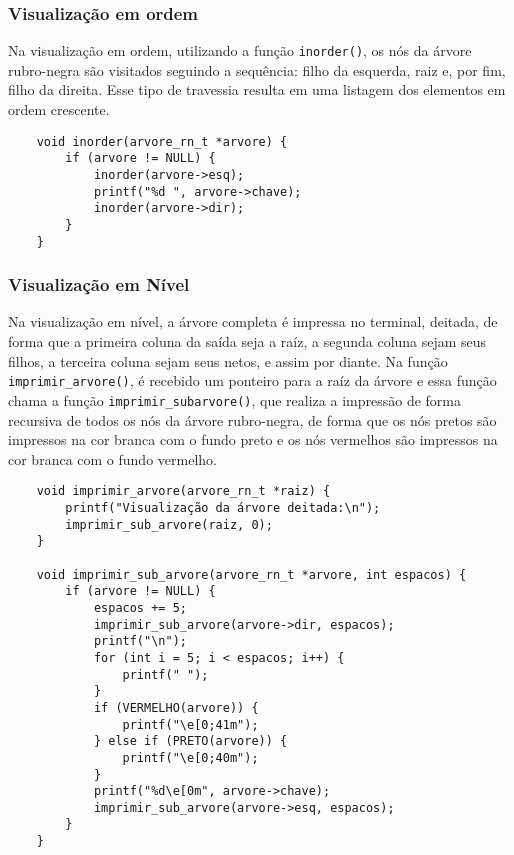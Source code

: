 \vspace{3mm}

\subsubsection{Visualização em ordem}

Na visualização em ordem, utilizando a função \texttt{inorder()}, os nós da árvore rubro-negra são visitados seguindo a sequência: filho da esquerda, raiz e, por fim, filho da direita. Esse tipo de travessia resulta em uma listagem dos elementos em ordem crescente.

\begin{lstlisting}
    void inorder(arvore_rn_t *arvore) {
        if (arvore != NULL) {
            inorder(arvore->esq);
            printf("%d ", arvore->chave);
            inorder(arvore->dir);
        }
    }
\end{lstlisting}

\vspace{3mm}

\subsubsection{Visualização em Nível}

Na visualização em nível, a árvore completa é impressa no terminal, deitada, de forma que a primeira coluna da saída seja a raíz, a segunda coluna sejam seus filhos, a terceira coluna sejam seus netos, e assim por diante. Na função \texttt{imprimir\_arvore()}, é recebido um ponteiro para a raíz da árvore e essa função chama a função \texttt{imprimir\_subarvore()}, que realiza a impressão de forma recursiva de todos os nós da árvore rubro-negra, de forma que os nós pretos são impressos na cor branca com o fundo preto e os nós vermelhos são impressos na cor branca com o fundo vermelho.

\begin{lstlisting}
    void imprimir_arvore(arvore_rn_t *raiz) {
        printf("Visualização da árvore deitada:\n");
        imprimir_sub_arvore(raiz, 0);
    }

    void imprimir_sub_arvore(arvore_rn_t *arvore, int espacos) {
        if (arvore != NULL) {
            espacos += 5;
            imprimir_sub_arvore(arvore->dir, espacos);
            printf("\n");
            for (int i = 5; i < espacos; i++) {
                printf(" ");
            }
            if (VERMELHO(arvore)) {
                printf("\e[0;41m");
            } else if (PRETO(arvore)) {
                printf("\e[0;40m");
            }
            printf("%d\e[0m", arvore->chave);
            imprimir_sub_arvore(arvore->esq, espacos);
        }
    }
\end{lstlisting}


